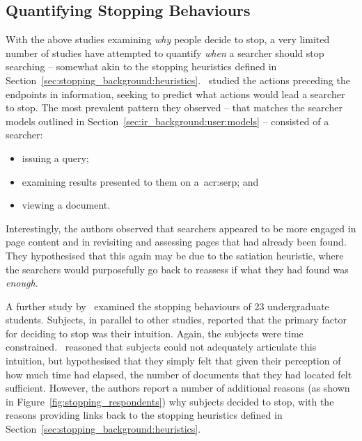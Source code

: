 \subsection{Quantifying Stopping Behaviours}
With the above studies examining \emph{why} people decide to stop, a very limited number of studies have attempted to quantify \emph{when} a searcher should stop searching -- somewhat akin to the stopping heuristics defined in Section~\ref{sec:stopping_background:heuristics}.~\cite{toms2009predicting_stopping} studied the actions preceding the endpoints in information, seeking to predict what actions would lead a searcher to stop. The most prevalent pattern they observed -- that matches the searcher models outlined in Section~\ref{sec:ir_background:user:models} -- consisted of a searcher:

\vspace{-5mm}
\begin{itemize}
    \item{issuing a query;}
    \item{examining results presented to them on a~\gls{acr:serp}; and}
    \item{viewing a document.}
\end{itemize}
\vspace{-5mm}

Interestingly, the authors observed that searchers appeared to be more engaged in page content and in revisiting and assessing pages that had already been found. They hypothesised that this again may be due to the satiation heuristic, where the searchers would purposefully go back to reassess if what they had found was \emph{enough.}

A further study by~\cite{dostert2009satisficing} examined the stopping behaviours of 23 undergraduate students. Subjects, in parallel to other studies, reported that the primary factor for deciding to stop was their intuition. Again, the subjects were time constrained.~\cite{dostert2009satisficing} reasoned that subjects could not adequately articulate this intuition, but hypothesised that they simply felt that given their perception of how much time had elapsed, the number of documents that they had located felt sufficient. However, the authors report a number of additional reasons (as shown in Figure~\ref{fig:stopping_respondents}) why subjects decided to stop, with the reasons providing links back to the stopping heuristics defined in Section~\ref{sec:stopping_background:heuristics}.

